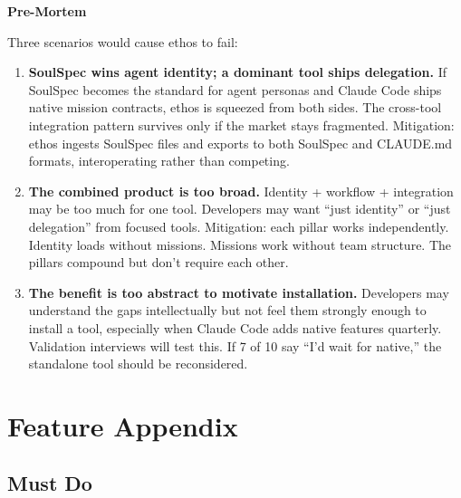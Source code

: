 \documentclass[11pt,letterpaper]{article}
\newcommand{\prsection}[1]{%
  \vspace{1em}%
  {\large\bfseries\color{SectionBlue}#1}%
  \vspace{0.3em}\par%
}
\begin{document}
\prsection{Pre-Mortem}

Three scenarios would cause ethos to fail:

\begin{enumerate}[nosep]
  \item \textbf{SoulSpec wins agent identity; a dominant tool ships delegation.} If SoulSpec becomes the standard for agent personas and Claude Code ships native mission contracts, ethos is squeezed from both sides. The cross-tool integration pattern survives only if the market stays fragmented. Mitigation: ethos ingests SoulSpec files and exports to both SoulSpec and CLAUDE.md formats, interoperating rather than competing.
  \item \textbf{The combined product is too broad.} Identity + workflow + integration may be too much for one tool. Developers may want ``just identity'' or ``just delegation'' from focused tools. Mitigation: each pillar works independently. Identity loads without missions. Missions work without team structure. The pillars compound but don't require each other.
  \item \textbf{The benefit is too abstract to motivate installation.} Developers may understand the gaps intellectually but not feel them strongly enough to install a tool, especially when Claude Code adds native features quarterly. Validation interviews will test this. If 7 of 10 say ``I'd wait for native,'' the standalone tool should be reconsidered.
\end{enumerate}


\newpage
\section*{Feature Appendix}

\subsection*{Must Do}
\end{document}
